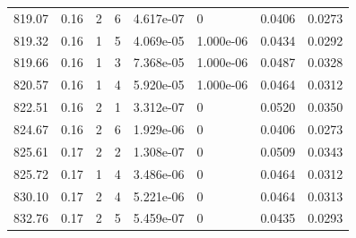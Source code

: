 \documentclass[preview]{standalone}
\begin{document}
{{{{{{{{\begin{tabular}{L{1.2cm}C{1.2cm} C{0.3cm}C{0.5cm} C{1.4cm}C{1.4cm} C{1.4cm}C{1.4cm}}
  819.07  &  0.16  & 2     &  6 &  4.617e-07  & 0  & 0.0406 &  0.0273   \\ 
  819.32  &  0.16  & 1     &  5 &  4.069e-05  & 1.000e-06  & 0.0434 &  0.0292   \\ 
  819.66  &  0.16  & 1     &  3 &  7.368e-05  & 1.000e-06  & 0.0487 &  0.0328   \\ 
  820.57  &  0.16  & 1     &  4 &  5.920e-05  & 1.000e-06  & 0.0464 &  0.0312   \\ 
  822.51  &  0.16  & 2     &  1 &  3.312e-07  & 0  & 0.0520 &  0.0350   \\ 
  824.67  &  0.16  & 2     &  6 &  1.929e-06  & 0  & 0.0406 &  0.0273   \\ 
  825.61  &  0.17  & 2     &  2 &  1.308e-07  & 0  & 0.0509 &  0.0343   \\ 
  825.72  &  0.17  & 1     &  4 &  3.486e-06  & 0  & 0.0464 &  0.0312   \\ 
  830.10  &  0.17  & 2     &  4 &  5.221e-06  & 0  & 0.0464 &  0.0313   \\ 
  832.76  &  0.17  & 2     &  5 &  5.459e-07  & 0  & 0.0435 &  0.0293   \\ 
\hline 
\end{tabular} 

}}}}}}}}
\end{document}
